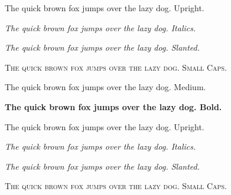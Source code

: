 \textup{The quick brown fox jumps over the lazy dog. Upright.}

\textit{The quick brown fox jumps over the lazy dog. Italics.}

\textsl{The quick brown fox jumps over the lazy dog. Slanted.}

\textsc{The quick brown fox jumps over the lazy dog. Small Caps.}

\rmfamily\blindtext

\textmd{The quick brown fox jumps over the lazy dog. Medium.}

\textbf{The quick brown fox jumps over the lazy dog. Bold.}

\textup{The quick brown fox jumps over the lazy dog. Upright.}

\textit{The quick brown fox jumps over the lazy dog. Italics.}

\textsl{The quick brown fox jumps over the lazy dog. Slanted.}

\textsc{The quick brown fox jumps over the lazy dog. Small Caps.}

